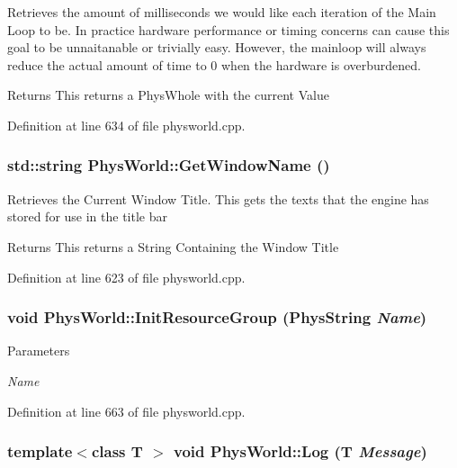 Retrieves the amount of milliseconds we would like each iteration of the Main Loop to be. In practice hardware performance or timing concerns can cause this goal to be unnaitanable or trivially easy. However, the mainloop will always reduce the actual amount of time to 0 when the hardware is overburdened. \begin{DoxyReturn}{Returns}
This returns a PhysWhole with the current Value 
\end{DoxyReturn}


Definition at line 634 of file physworld.cpp.\hypertarget{classPhysWorld_a09163480a549b39a945ee97415eabdc0}{
\subsubsection[{GetWindowName}]{\setlength{\rightskip}{0pt plus 5cm}std::string PhysWorld::GetWindowName ()}}
\label{db/df5/classPhysWorld_a09163480a549b39a945ee97415eabdc0}


Retrieves the Current Window Title. This gets the texts that the engine has stored for use in the title bar \begin{DoxyReturn}{Returns}
This returns a String Containing the Window Title 
\end{DoxyReturn}


Definition at line 623 of file physworld.cpp.\hypertarget{classPhysWorld_a0b67df4c76c32b9b2bdcafdc51f6aba7}{
\subsubsection[{InitResourceGroup}]{\setlength{\rightskip}{0pt plus 5cm}void PhysWorld::InitResourceGroup (PhysString {\em Name})}}
\label{db/df5/classPhysWorld_a0b67df4c76c32b9b2bdcafdc51f6aba7}

\begin{DoxyParams}{Parameters}
\item[{\em Name}]\end{DoxyParams}


Definition at line 663 of file physworld.cpp.\hypertarget{classPhysWorld_a5e9fead1c3100f5dbd5ca985b82b85ea}{
\subsubsection[{Log}]{\setlength{\rightskip}{0pt plus 5cm}template$<$class T $>$ void PhysWorld::Log (T {\em Message})}}
\label{db/df5/classPhysWorld_a5e9fead1c3100f5dbd5ca985b82b85ea}



